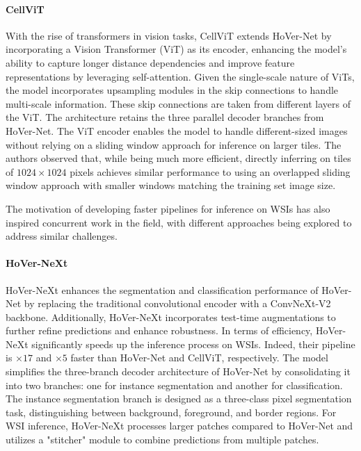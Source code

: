 \paragraph{CellViT \cite{hörst2023cellvit}} With the rise of transformers in vision tasks, CellViT extends HoVer-Net by incorporating a Vision Transformer (ViT) as its encoder, enhancing the model's ability to capture longer distance dependencies and improve feature representations by leveraging self-attention. Given the single-scale nature of ViTs, the model incorporates upsampling modules in the skip connections to handle multi-scale information. These skip connections are taken from different layers of the ViT. The architecture retains the three parallel decoder branches from HoVer-Net. The ViT encoder enables the model to handle different-sized images without relying on a sliding window approach for inference on larger tiles. The authors observed that, while being much more efficient, directly inferring on tiles of $1024 \times 1024$ pixels achieves similar performance to using an overlapped sliding window approach with smaller windows matching the training set image size.

The motivation of developing faster pipelines for inference on WSIs has also inspired concurrent work in the field, with different approaches being explored to address similar challenges.

\paragraph{HoVer-NeXt \cite{baumann2024hover}} HoVer-NeXt enhances the segmentation and classification performance of HoVer-Net by replacing the traditional convolutional encoder with a ConvNeXt-V2 backbone. Additionally, HoVer-NeXt incorporates test-time augmentations to further refine predictions and enhance robustness. In terms of efficiency, HoVer-NeXt significantly speeds up the inference process on WSIs. Indeed, their pipeline is $\times17$ and $\times5$ faster than HoVer-Net and CellViT, respectively. The model simplifies the three-branch decoder architecture of HoVer-Net by consolidating it into two branches: one for instance segmentation and another for classification. The instance segmentation branch is designed as a three-class pixel segmentation task, distinguishing between background, foreground, and border regions. For WSI inference, HoVer-NeXt processes larger patches compared to HoVer-Net and utilizes a "stitcher" module to combine predictions from multiple patches.

